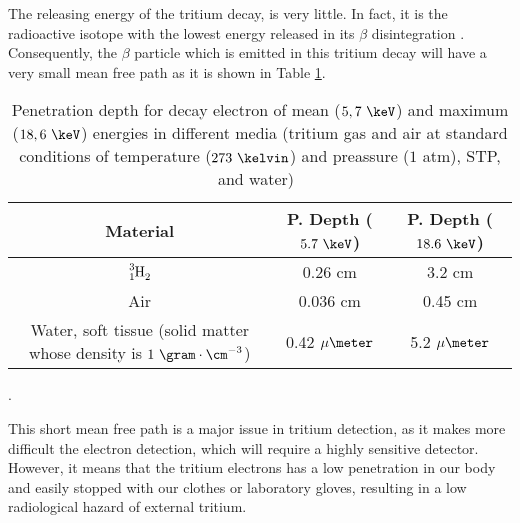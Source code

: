 
The releasing energy of the tritium decay, is very little. In fact, it is the radioactive isotope with the lowest energy released in its $\beta$ disintegration \cite{TritiumHandling}. Consequently, the $\beta$ particle which is emitted in this tritium decay will have a very small mean free path as it is shown in Table \ref{tab:MeanFreePathTritium}.

\begin{table}[htbp]
\begin{center}
\begin{tabular}{|c|c|c|}
\hline
Material & P. Depth ($5.7~\keV$) & P. Depth ($18.6~\keV$)\\
\hline \hline \hline
$\ce{\ce{^{3}_{1}H_2}}$ & 0.26 cm & 3.2 cm \\ \hline
Air & 0.036 cm & 0.45 cm \\ \hline
\parbox{10em}{\centering Water, soft tissue\\  (solid matter whose \\  density is $1~\gram\cdot\cm^{-3}$)} & 0.42 $\mu\meter$ & 5.2 $\mu\meter$ \\ \hline
\end{tabular}
\caption{Penetration depth for decay electron of mean ($5,7~\keV$) and maximum ($18,6~\keV$) energies in different media (tritium gas and air at standard conditions of temperature ($273~\kelvin$) and preassure ($1$ atm), STP, and water)~\cite{MeanFreePathDocument}}.
\label{tab:MeanFreePathTritium}
\end{center}
\end{table}

This short mean free path is a major issue in tritium detection, as it makes more difficult the electron detection, which will require a highly sensitive detector. However, it means that the tritium electrons has a low penetration in our body and easily stopped with our clothes or laboratory gloves, resulting in a low radiological hazard of external tritium.

